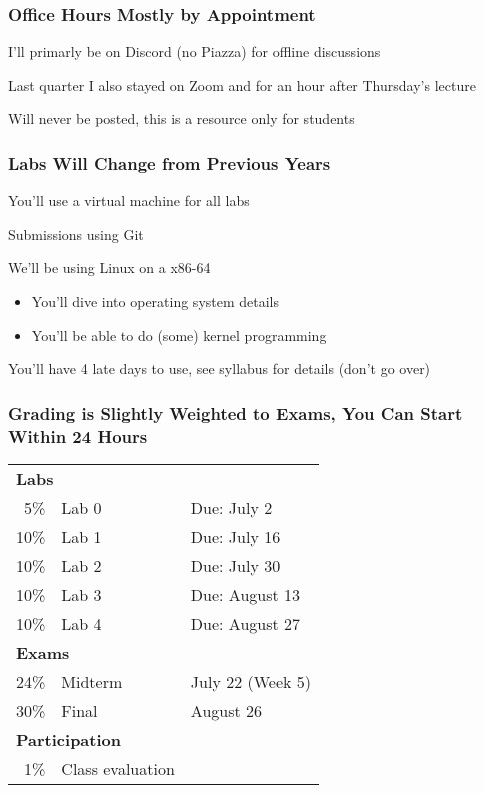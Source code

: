   \begin{frame}
    \frametitle{Office Hours Mostly by Appointment}

    I'll primarly be on Discord (no Piazza) for offline discussions

    \vspace{2em}

    Last quarter I also stayed on Zoom and for an hour after Thursday's lecture

    \vspace{2em}

    Will never be posted, this is a resource only for students
  \end{frame}

  \begin{frame}
    \frametitle{Labs Will Change from Previous Years}

    You'll use a virtual machine for all labs

    \vspace{2em}

    Submissions using Git

    \vspace{2em}

    We'll be using Linux on a x86-64

    \begin{itemize}
      \item You'll dive into operating system details
      \item You'll be able to do (some) kernel programming
    \end{itemize}

    \vspace{2em}

    You'll have 4 late days to use, see syllabus for details (don't go over)
  \end{frame}

  \begin{frame}
    \frametitle{Grading is Slightly Weighted to Exams, You Can Start Within 24 Hours}

    \begin{tabular}{rll}
      \multicolumn{2}{l}{\bfseries Labs} \\
       5\% & Lab 0 & Due: July 2 \\
      10\% & Lab 1 & Due: July 16 \\
      10\% & Lab 2 & Due: July 30 \\
      10\% & Lab 3 & Due: August 13\\
      10\% & Lab 4 & Due: August 27 \\
      \multicolumn{2}{l}{\bfseries Exams} \\
      24\% & Midterm & July 22 (Week 5) \\
      30\% & Final & August 26 \\
      \multicolumn{2}{l}{\bfseries Participation} \\
       1\% & Class evaluation \\
    \end{tabular}
  \end{frame}

